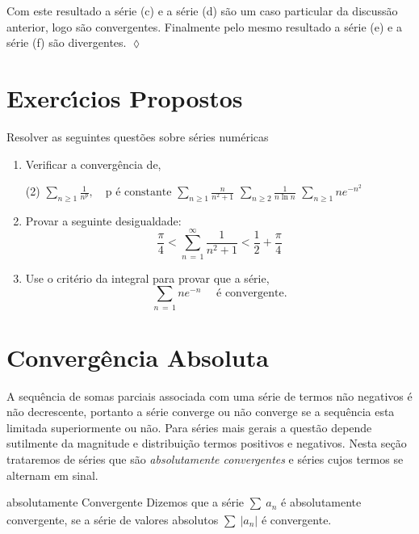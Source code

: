 Com este resultado a s\'{e}rie (c) e a s\'{e}rie (d) s\~{a}o um caso
particular da discuss\~{a}o anterior, logo s\~{a}o convergentes. Finalmente
pelo mesmo resultado a s\'{e}rie (e) e a s\'{e}rie  (f) s\~{a}o divergentes. \hfill \(\lozenge\)

\section*{Exerc\'{\i}cios Propostos} 
Resolver as seguintes quest\~{o}es sobre s\'{e}ries num\'{e}ricas
\begin{enumerate}[label=\rm{(\arabic*)}]
\item Verificar a converg\^encia de,
\begin{tasks}[label=(\alph*),item-indent=3em,label-width=4ex,ref=(\alph*)](2)
\task \(\displaystyle{\sum_{n\geq1}\frac{1}{n^p}},\quad \textrm{p \'{e} constante}\)
\task \(\displaystyle{\sum_{n\geq 1}\frac{n}{n^2+1}}\)
\task \(\displaystyle{\sum_{n\geq 2}\frac{1}{n\ln n}}\)
\task  \(\displaystyle{\sum_{n\geq 1}n e^{-n^2}}\)
\end{tasks}
\item Provar a seguinte desigualdade:
\begin{equation*}
\dfrac{\pi}{4} < \sum_{n\,=\, 1}^{\infty} \dfrac{1}{n^2+1} <\dfrac{1}{2}+\dfrac{\pi}{4}
\end{equation*}
\item Use o crit\'{e}rio  da integral para provar que a s\'{e}rie,
\begin{equation*}
\sum_{n\, =\, 1}n e^{-n} \quad \text{ \'e convergente.}
\end{equation*}
\end{enumerate}

\section{Converg\^{e}ncia Absoluta}
A sequ\^{e}ncia de somas parciais associada com uma s\'{e}rie de termos n\~{a}o negativos \'{e} n\~{a}o 
decrescente, portanto a s\'{e}rie converge ou n\~{a}o converge se a sequ\^{e}ncia esta limitada 
superiormente ou n\~{a}o. Para s\'{e}ries mais gerais a quest\~{a}o depende sutilmente da magnitude e 
distribui\c{c}\~{a}o termos positivos e negativos. Nesta se\c{c}\~{a}o trataremos de s\'{e}ries 
que s\~{a}o \textit{absolutamente convergentes} e s\'{e}ries cujos termos se alternam em sinal.

\begin{defic}{absolutamente Convergente}{}
Dizemos que a s\'{e}rie $\sum_{}\,a_{n}$ \'{e} absolutamente
convergente, se a s\'{e}rie de valores absolutos
$\sum_{}\,|a_{n}|$ \'{e} convergente.
\end{defic}

